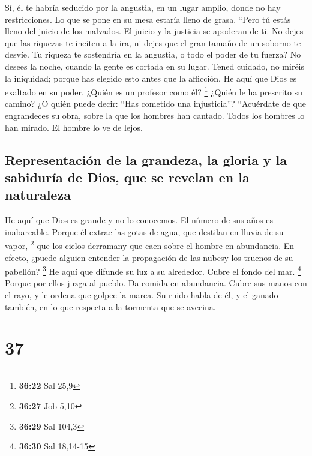  Sí, él te habría seducido por la angustia, en un lugar
amplio, donde no hay restricciones. Lo que se pone en su mesa estaría
lleno de grasa.  ``Pero tú estás lleno del juicio de los
malvados. El juicio y la justicia se apoderan de ti.  No
dejes que las riquezas te inciten a la ira, ni dejes que el gran tamaño
de un soborno te desvíe.  Tu riqueza te sostendría en la
angustia, o todo el poder de tu fuerza?  No desees la
noche, cuando la gente es cortada en su lugar.  Tened
cuidado, no miréis la iniquidad; porque has elegido esto antes que la
aflicción.  He aquí que Dios es exaltado en su poder.
¿Quién es un profesor como él? \footnote{\textbf{36:22} Sal 25,9}
 ¿Quién le ha prescrito su camino? ¿O quién puede decir:
``Has cometido una injusticia''?  ``Acuérdate de que
engrandeces su obra, sobre la que los hombres han cantado.
 Todos los hombres lo han mirado. El hombre lo ve de
lejos.

\hypertarget{representaciuxf3n-de-la-grandeza-la-gloria-y-la-sabiduruxeda-de-dios-que-se-revelan-en-la-naturaleza}{%
\subsection{Representación de la grandeza, la gloria y la sabiduría de
Dios, que se revelan en la
naturaleza}\label{representaciuxf3n-de-la-grandeza-la-gloria-y-la-sabiduruxeda-de-dios-que-se-revelan-en-la-naturaleza}}

 He aquí que Dios es grande y no lo conocemos. El número
de sus años es inabarcable.  Porque él extrae las gotas
de agua, que destilan en lluvia de su vapor, \footnote{\textbf{36:27}
  Job 5,10}  que los cielos derramany que caen sobre el
hombre en abundancia.  En efecto, ¿puede alguien entender
la propagación de las nubesy los truenos de su pabellón? \footnote{\textbf{36:29}
  Sal 104,3}  He aquí que difunde su luz a su alrededor.
Cubre el fondo del mar. \footnote{\textbf{36:30} Sal 18,14-15}
 Porque por ellos juzga al pueblo. Da comida en
abundancia.  Cubre sus manos con el rayo, y le ordena que
golpee la marca.  Su ruido habla de él, y el ganado
también, en lo que respecta a la tormenta que se avecina.

\hypertarget{section-36}{%
\section{37}\label{section-36}}

